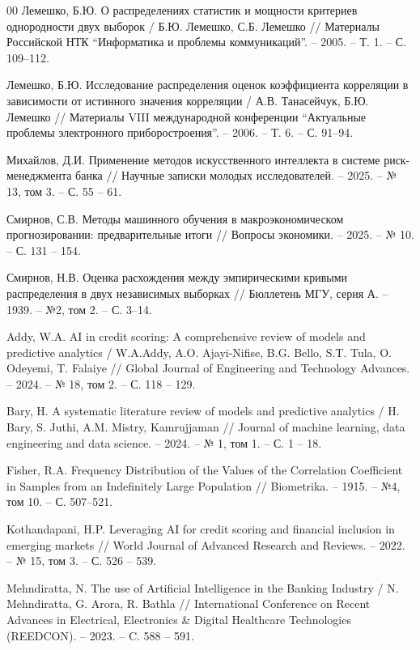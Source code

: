 \begin{thebibliography}{00}
	 Лемешко, Б.Ю. О распределениях статистик и мощности критериев однородности двух выборок / Б.Ю. Лемешко, С.Б. Лемешко // Материалы Российской НТК “Информатика и проблемы коммуникаций”. -- 2005. -- Т. 1. -- С. 109--112.
	
	 Лемешко, Б.Ю. Исследование распределения оценок коэффициента корреляции в зависимости от истинного значения корреляции / А.В. Танасейчук, Б.Ю. Лемешко // Материалы VIII международной конференции “Актуальные проблемы электронного приборострое­ния”. -- 2006. -- Т. 6. -- С. 91--94.
	
	 Михайлов, Д.И. Применение методов искусственного интеллекта в системе риск-менеджмента банка // Научные записки молодых исследователей. -- 2025. -- № 13, том 3. -- С. 55 -- 61.
	
	 Смирнов, С.В. Методы машинного обучения в макроэкономическом прогнозировании: предварительные итоги // Вопросы экономики. -- 2025. -- № 10. -- С. 131 -- 154.
	
	 Смирнов, Н.В. Оценка расхождения между эмпирическими кривыми распределения в двух независимых выборках // Бюллетень МГУ, серия А. -- 1939. -- №2, том 2. -- С. 3--14.
	
	 Addy, W.A. AI in credit scoring: A comprehensive review of models and predictive analytics / W.A.Addy, A.O. Ajayi-Nifise, B.G. Bello, S.T. Tula, O. Odeyemi, T. Falaiye // Global Journal of Engineering and Technology Advances. -- 2024. -- № 18, том 2. -- С. 118 -- 129.
	
	
	 Bary, H. A systematic literature review of models and predictive analytics / H. Bary, S. Juthi, A.M. Mistry, Kamrujjaman // Journal of machine learning, data engineering and data science. -- 2024. -- № 1, том 1. -- С. 1 -- 18. 
	
	 Fisher, R.A. Frequency Distribution of the Values of the Correlation Coefficient in Samples from an Indefinitely Large Population // Biometrika. -- 1915. -- №4, том 10. -- С. 507--521.
	
	 Kothandapani, H.P. Leveraging AI for credit scoring and financial inclusion in emerging markets // World Journal of Advanced Research and Reviews. -- 2022. -- № 15, том 3. -- С. 526 -- 539.
	
	 Mehndiratta, N. The use of Artificial Intelligence in the Banking Industry / N. Mehndiratta, G. Arora, R. Bathla // International Conference on Recent Advances in Electrical, Electronics \& Digital Healthcare Technologies (REEDCON). -- 2023. -- C. 588 -- 591.
	

\end{thebibliography}
